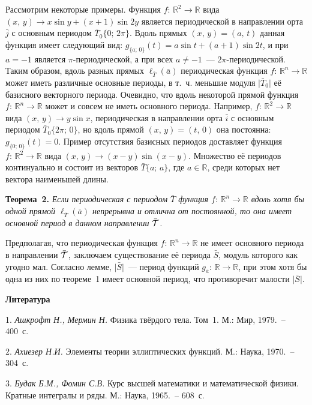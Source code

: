 Рассмотрим некоторые примеры. Функция $f:\,{\mathbb R}^{2}\to{\mathbb R}$ вида $(x,\,y)\to x\sin y+(x+1)\sin 2y$ является периодической в направлении орта $\bar{j}$ с основным периодом $\bar{T}_{0}\lbrace0;\,2\pi\rbrace$. Вдоль прямых $(x,\,y)=(a,\,t)$ данная функция имеет следующий вид: $g_{\lbrace a;\,0\rbrace}(t)=a\sin t+(a+1)\sin 2t$, и при $a=-1$ является $\pi$-периодической, а при всех $a\neq-1$~--- $2\pi$-периодической. Таким образом, вдоль разных прямых $\ell_{\bar{T}}(\bar{a})$ периодическая функция $f:\,{\mathbb R}^{n}\to{\mathbb R}$ может иметь различные основные периоды, в т.~ч. меньшие модуля $\vert\bar{T}_{0}\vert$ её базисного векторного периода. Очевидно, что вдоль некоторой прямой функция $f:\,{\mathbb R}^{n}\to{\mathbb R}$ может и совсем не иметь основного периода. Например, $f:\,{\mathbb R}^{2}\to{\mathbb R}$ вида $(x,\,y)\to y\sin x$, периодическая в направлении орта $\bar{i}$ с основным периодом $\bar{T}_{0}\lbrace 2\pi;\,0\rbrace$, но вдоль прямой $(x,\,y)=(t,\,0)$ она постоянна: $g_{\lbrace 0;\,0\rbrace}(t)=0$. Пример отсутствия базисных периодов доставляет функция $f:\,{\mathbb R}^{2}\to{\mathbb R}$ вида $(x,\,y)\to(x-y)\sin(x-y)$. Множество её периодов континуально и состоит из векторов $\bar{T}\lbrace a;\,a\rbrace$, где $a\in{\mathbb R}$, среди которых нет вектора наименьшей длины.

\textbf{Теорема~2.} {\it Если периодическая с периодом $\bar{T}$ функция $f:\,{\mathbb R}^{n}\to {\mathbb R}$ вдоль хотя бы одной прямой $\ell_{\bar{T}}(\bar{a})$ непрерывна и отлична от постоянной, то она имеет основной период в данном направлении $\bar{{\cal T}}$.}

Предполагая, что периодическая функция $f:\,{\mathbb R}^{n}\to {\mathbb R}$ не имеет основного периода в направлении $\bar{{\cal T}}$, заключаем существование её периода $\bar{S}$, модуль которого как угодно мал. Согласно лемме, $\vert\bar{S}\vert$~--- период функций $g_{\bar{a}}:\,{\mathbb R}\to {\mathbb R}$, при этом хотя бы одна из них по теореме~1 имеет основной период, что противоречит малости $\vert\bar{S}\vert$.

\smallskip \centerline{\bf Литература}\nopagebreak

1. {\it Ашкрофт Н., Мермин Н.} Физика твёрдого тела. Том~1. М.: Мир, 1979.~-- 400~с.

2. {\it Ахиезер Н.И.} Элементы теории эллиптических функций. М.:  Наука, 1970.~-- 304~с.

3. {\it Будак Б.М., Фомин С.В.} Курс высшей математики и математической физики. Кратные интегралы и ряды. М.: Наука, 1965.~-- 608~с.

